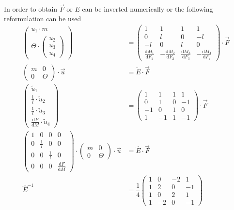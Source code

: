 In order to obtain $\vec{F}$ or $E$ can be inverted numerically or the following reformulation can be used
\begin{align*}
	\begin{pmatrix}
		u_1 \cdot m \\
		\Theta \cdot \begin{pmatrix} u_2 \\ u_3 \\ u_4 \end{pmatrix}
	\end{pmatrix} &= \begin{pmatrix}
		1 & 1 & 1 & 1 \\
		0 & l & 0 & -l \\
		-l & 0 &  l & 0 \\
		\frac{\text{d}M_1}{\text{d}F_1} & -\frac{\text{d}M_2}{\text{d}F_2} & 			\frac{\text{d}M_3}{\text{d}F_3} & -\frac{\text{d}M_4}{\text{d}F_4}
	\end{pmatrix} \cdot \vec{F} 
	\\[0.5em]
	\begin{pmatrix}
		m & 0 \\
		0 & \Theta
	\end{pmatrix} \cdot \vec{u} &= \tilde{E} \cdot \vec{F}
	\\[0.5em]
	\begin{pmatrix} \tilde{u}_1 \\ \frac{1}{l} \cdot \tilde{u}_2 \\ \frac{1}{l} \cdot\tilde{u}_3 \\ \frac{\text{d}F}{\text{d}M} \cdot \tilde{u}_4 \end{pmatrix} &= \begin{pmatrix}
		1 & 1 & 1 & 1 \\
		0 & 1 & 0 & -1 \\
		-1 & 0 &  1 & 0 \\
		1 & -1 & 1 & -1
	\end{pmatrix} \cdot \vec{F}
	\\
	\begin{pmatrix}
		1 & 0 & 0 & 0 \\
		0 & \frac{1}{l} & 0 & 0 \\
		0 & 0 & \frac{1}{l} & 0 \\
		0 & 0 & 0 & \frac{\text{d}F}{\text{d}M}
	\end{pmatrix} \cdot
	\begin{pmatrix}
		m & 0 \\
		0 & \Theta
	\end{pmatrix} \cdot \vec{u} &= \hat{E} \cdot \vec{F}
	\\
	\hat{E}^{-1} &= \dfrac{1}{4}\begin{pmatrix}
		1 &  0 & -2 &  1 \\
		1 &  2 &  0 & -1 \\
		1 &  0 &  2 &  1 \\
		1 & -2 &  0 & -1
	\end{pmatrix}
\end{align*} 

